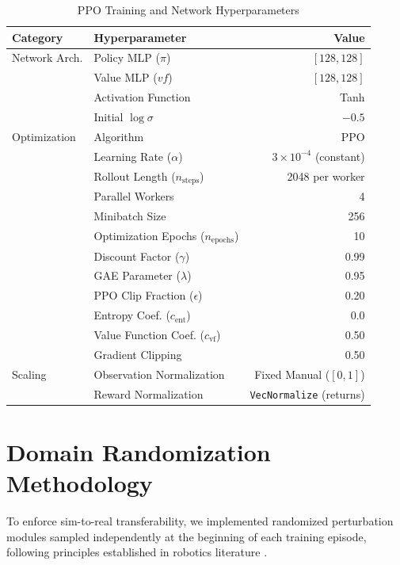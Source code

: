 \documentclass[conference]{IEEEtran}
\begin{document}
\begin{table}[t]
\caption{PPO Training and Network Hyperparameters}
\centering
\begin{tabular}{llr}
\toprule
\textbf{Category} & \textbf{Hyperparameter} & \textbf{Value} \\
\midrule
Network Arch. & Policy MLP ($\pi$) & $[128, 128]$ \\
              & Value MLP ($vf$) & $[128, 128]$ \\
              & Activation Function & Tanh \\
              & Initial $\log \sigma$ & $-0.5$ \\
\midrule
Optimization  & Algorithm & PPO \cite{schulman2017proximal} \\
              & Learning Rate ($\alpha$) & $3 \times 10^{-4}$ (constant) \\
              & Rollout Length ($n_{\text{steps}}$) & 2048 per worker \\
              & Parallel Workers & 4 \\
              & Minibatch Size & 256 \\
              & Optimization Epochs ($n_{\text{epochs}}$) & 10 \\
              & Discount Factor ($\gamma$) & 0.99 \\
              & GAE Parameter ($\lambda$) & 0.95 \\
              & PPO Clip Fraction ($\epsilon$) & 0.20 \\
              & Entropy Coef. ($c_{\text{ent}}$) & 0.0 \\
              & Value Function Coef. ($c_{\text{vf}}$) & 0.50 \\
              & Gradient Clipping & 0.50 \\
\midrule
Scaling       & Observation Normalization & Fixed Manual ($[0, 1]$) \\
              & Reward Normalization & \texttt{VecNormalize} (returns) \\
\bottomrule
\end{tabular}
\label{tab:hyperparams}
\end{table}

\section{Domain Randomization Methodology}
To enforce sim-to-real transferability, we implemented randomized perturbation modules sampled independently at the beginning of each training episode, following principles established in robotics literature \cite{tobin2017domain, peng2018sim}.
\end{document}
